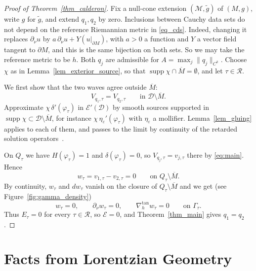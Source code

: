 \documentclass[12pt,reqno]{amsart}
\numberwithin{equation}{section}
\theoremstyle{definition}
\theoremstyle{plain}
\theoremstyle{definition}
\theoremstyle{definition}
\newcommand{\M}{\mathcal{M}}
\newcommand{\D}{\mathcal{D}}
\newcommand{\uu}{M}
\DeclareMathOperator{\supp}{supp}
\begin{document}
\begin{proof}[Proof of Theorem~\ref{thm_calderon}]
Fix a null-cone extension $(\M,\tilde g)$ of $(\uu,g)$, write $g$ for $\tilde g$, and extend $q_1,q_2$ by zero. Inclusions between Cauchy data sets do not depend on the reference Riemannian metric in \eqref{eq_cds}. Indeed, changing it replaces $\partial_\nu u$ by $a\,\partial_\nu u+Y(u|_{\partial\uu})$, with $a>0$ a function and $Y$ a vector field tangent to $\partial\uu$, and this is the same bijection on both sets. So we may take the reference metric to be $h$. Both $q_j$ are admissible for $A=\max_j\|q_j\|_{C^k}$. Choose $\chi$ as in Lemma~\ref{lem_exterior_source}, so that $\supp\chi\cap\overline\uu=\emptyset$, and let $\tau\in\mathcal R$.

We first show that the two waves agree outside $\overline\uu$:
\[
V_{q_1,\tau}=V_{q_2,\tau}\qquad\text{in }\D\setminus\overline\uu .
\]
Approximate $\chi\,\delta'(\varphi_\tau)$ in $\mathcal E'(\D)$ by smooth sources supported in $\supp\chi\subset\D\setminus\overline\uu$, for instance $\chi\,\eta_\varepsilon'(\varphi_\tau)$ with $\eta_\varepsilon$ a mollifier. Lemma~\ref{lem_gluing} applies to each of them, and passes to the limit by continuity of the retarded solution operators~\cite{bar2007}.

On $Q_\tau$ we have $H(\varphi_\tau)=1$ and $\delta(\varphi_\tau)=0$, so $V_{q_j,\tau}=v_{j,\tau}$ there by \eqref{eq:main}. Hence
\[
w_\tau=v_{1,\tau}-v_{2,\tau}=0\qquad\text{on }Q_\tau\setminus\overline\uu .
\]
By continuity, $w_\tau$ and $dw_\tau$ vanish on the closure of $Q_\tau\setminus\overline\uu$ and we get (see Figure~\ref{fig:gamma_density})
\[
w_\tau=0,\qquad \partial_\nu w_\tau=0,\qquad \nabla_h^{\tan}w_\tau=0\qquad\text{on }\Gamma_\tau .
\]
Thus $E_\tau=0$ for every $\tau\in\mathcal R$, so $\mathcal E=0$, and Theorem~\ref{thm_main} gives $q_1=q_2$.
\end{proof}







\appendix



\section{Facts from Lorentzian Geometry}\label{ap_lorentz}
\end{document}
